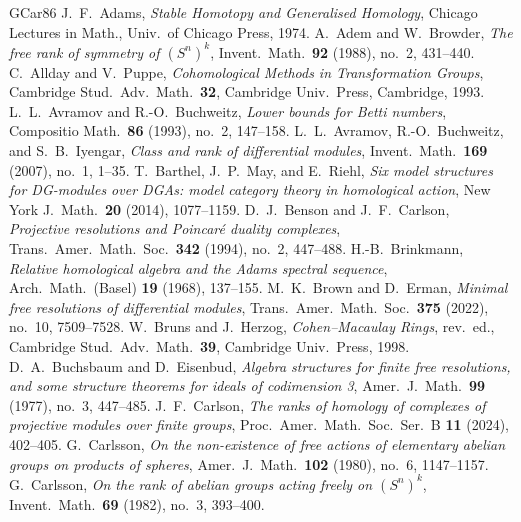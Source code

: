 \documentclass[11pt,reqno]{amsart}
\theoremstyle{plain}
\theoremstyle{definition}
\begin{document}
\begin{thebibliography}{GCar86}
\setlength{\itemsep}{0pt}
\setlength{\parsep}{0pt}
 J.~F.~Adams, \emph{Stable Homotopy and Generalised Homology}, Chicago Lectures in
Math., Univ.\ of Chicago Press, 1974.
 A.~Adem and W.~Browder, \emph{The free rank of symmetry of $(S^n)^k$},
Invent.\ Math.\ \textbf{92} (1988), no.~2, 431--440.
 C.~Allday and V.~Puppe, \emph{Cohomological Methods in Transformation
Groups}, Cambridge Stud.\ Adv.\ Math.\ \textbf{32}, Cambridge Univ.\ Press, Cambridge, 1993.
 L.~L.~Avramov and R.-O.~Buchweitz, \emph{Lower bounds for Betti
numbers}, Compositio Math.\ \textbf{86} (1993), no.~2, 147--158.
 L.~L.~Avramov, R.-O.~Buchweitz, and S.~B.~Iyengar, \emph{Class and rank of
differential modules}, Invent.\ Math.\ \textbf{169} (2007), no.~1, 1--35.
 T.~Barthel, J.~P.~May, and E.~Riehl, \emph{Six model structures for
DG-modules over DGAs: model category theory in homological action}, New York J.\ Math.\ \textbf{20}
(2014), 1077--1159.
 D.~J.~Benson and J.~F.~Carlson, \emph{Projective resolutions and
Poincar\'e duality complexes}, Trans.\ Amer.\ Math.\ Soc.\ \textbf{342} (1994), no.~2, 447--488.
 H.-B.~Brinkmann, \emph{Relative homological algebra and the Adams spectral
sequence}, Arch.\ Math.\ (Basel) \textbf{19} (1968), 137--155.
 M.~K.~Brown and D.~Erman, \emph{Minimal free resolutions of differential
modules}, Trans.\ Amer.\ Math.\ Soc.\ \textbf{375} (2022), no.~10, 7509--7528.
 W.~Bruns and J.~Herzog, \emph{Cohen--Macaulay Rings}, rev.\ ed., Cambridge
Stud.\ Adv.\ Math.\ \textbf{39}, Cambridge Univ.\ Press, 1998.
 D.~A.~Buchsbaum and D.~Eisenbud, \emph{Algebra structures for finite
free resolutions, and some structure theorems for ideals of codimension 3}, Amer.\ J.\ Math.\
\textbf{99} (1977), no.~3, 447--485.
 J.~F.~Carlson, \emph{The ranks of homology of complexes of projective
modules over finite groups}, Proc.\ Amer.\ Math.\ Soc.\ Ser.\ B \textbf{11} (2024), 402--405.
\bibitem[GCar80]{CarlssonSpheres} G.~Carlsson, \emph{On the non-existence of free actions of elementary
abelian groups on products of spheres}, Amer.\ J.\ Math.\ \textbf{102} (1980), no.~6, 1147--1157.
\bibitem[GCar82]{CarlssonSphereRank} G.~Carlsson, \emph{On the rank of abelian groups acting freely on
$(S^n)^k$}, Invent.\ Math.\ \textbf{69} (1982), no.~3, 393--400.

\end{thebibliography}
\end{document}
